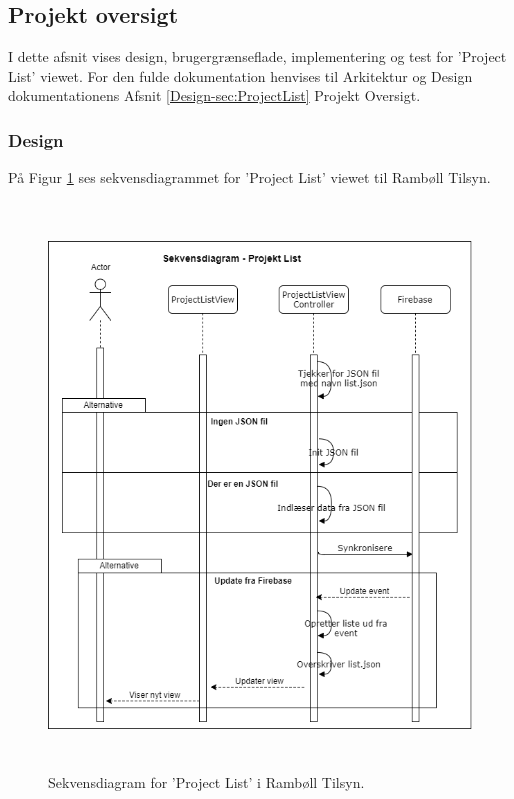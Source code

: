 \subsection{Projekt oversigt}
I dette afsnit vises design, brugergrænseflade, implementering og test for 'Project List' viewet. For den fulde dokumentation henvises til Arkitektur og Design dokumentationens Afsnit \ref{Design-sec:ProjectList} Projekt Oversigt.

\subsubsection{Design}
På Figur \ref{fig:ProjctListSekvens} ses sekvensdiagrammet for 'Project List' viewet til Rambøll Tilsyn.
\begin{figure}[H] %
	\centering
	\includegraphics[height=15cm, width=12cm]{../ArkitekturDesign/Design/ProjectList/ProjektListSekvensDiagram}
	\caption{Sekvensdiagram for 'Project List' i Rambøll Tilsyn.}
	\label{fig:ProjctListSekvens}
\end{figure}

\clearpage


